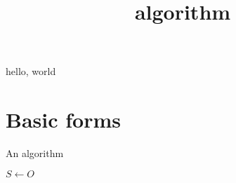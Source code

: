 \documentclass{amsart}
\title{algorithm}
\begin{document}
\maketitle

hello, world


\section{Basic forms}

\begin{algorithm}
    \caption{An algorithm}
	\label{alg:alg}
    \begin{algorithmic}[1]
        \STATE $S \leftarrow O$
    \end{algorithmic}
\end{algorithm}
\end{document}

